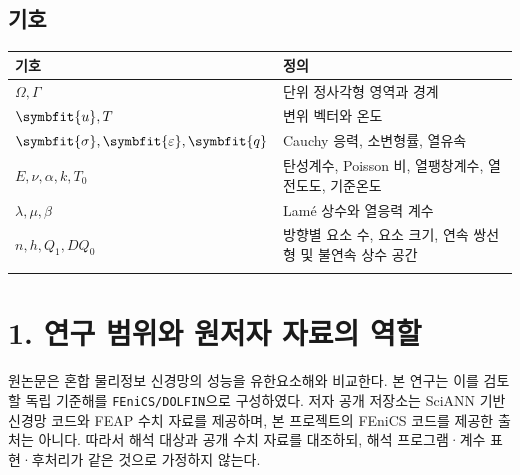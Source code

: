 \documentclass[10pt,a4paper]{article}
\renewcommand{\boldsymbol}[1]{\symbfit{#1}}
\begin{document}
\subsection{기호}

\begingroup\small

\par\begin{minipage}{\linewidth}\begin{tabular}{>{\raggedright\arraybackslash}p{}>{\raggedright\arraybackslash}p{}}

\rowcolor{tint} \textbf{기호} & \textbf{정의}\\\midrule

$\Omega,\Gamma$ & 단위 정사각형 영역과 경계\\\addlinespace[2pt]

$\boldsymbol u,T$ & 변위 벡터와 온도\\\addlinespace[2pt]

$\boldsymbol\sigma,\boldsymbol\varepsilon,\boldsymbol q$ & Cauchy 응력, 소변형률, 열유속\\\addlinespace[2pt]

$E,\nu,\alpha,k,T_0$ & 탄성계수, Poisson 비, 열팽창계수, 열전도도, 기준온도\\\addlinespace[2pt]

$\lambda,\mu,\beta$ & Lamé 상수와 열응력 계수\\\addlinespace[2pt]

$n,h,Q_1,DQ_0$ & 방향별 요소 수, 요소 크기, 연속 쌍선형 및 불연속 상수 공간\\\addlinespace[2pt]

\bottomrule\end{tabular}\end{minipage}\par\vspace{5pt}\endgroup

\tableofcontents\thispagestyle{fancy}

\clearpage

\section{1. 연구 범위와 원저자 자료의 역할}

원논문은 혼합 물리정보 신경망의 성능을 유한요소해와 비교한다. 본 연구는 이를 검토할 독립 기준해를 \nolinkurl{FEniCS/DOLFIN}으로 구성하였다. 저자 공개 저장소는 SciANN 기반 신경망 코드와 FEAP 수치 자료를 제공하며, 본 프로젝트의 FEniCS 코드를 제공한 출처는 아니다. 따라서 해석 대상과 공개 수치 자료를 대조하되, 해석 프로그램·계수 표현·후처리가 같은 것으로 가정하지 않는다.\par
\end{document}
